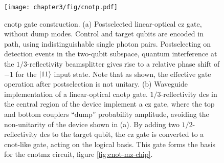\begin{figure}[t!]
\centering
\texttt{[image: chapter3/fig/cnotp.pdf]}
\caption[\acrshort{cnotp} gate construction]
{
\gls{cnotp} gate construction. (a) Postselected linear-optical \gls{cz} gate, without dump modes. Control and target qubits are encoded in path, using indistinguishable single photon pairs.  Postselecting on detection events in the two-qubit subspace, quantum interference at the $1/3$-reflectivity beamsplitter gives rise to a relative phase shift of $-1$ for the $\mbox{$ | 11 \rangle $}$ input state. Note that as shown, the effective gate operation after postselection is not unitary.
(b) Waveguide implementation of a linear-optical \gls{cnotp} gate. $1/3$-reflectivity \Glspl{dc} in the central region of the device implement a \gls{cz} gate, where the top and bottom couplers ``dump'' probability amplitude, avoiding the non-unitarity of the device shown in (a). By adding two $1/2$-reflectivity \glspl{dc} to the target qubit, the \gls{cz} gate is converted to a \gls{cnot}-like gate, acting on the logical basis. This gate forms the basis for the \gls{cnotmz} circuit, figure \ref{fig:cnot-mz-chip}.
}
\label{fig:cnotp}
\end{figure}

